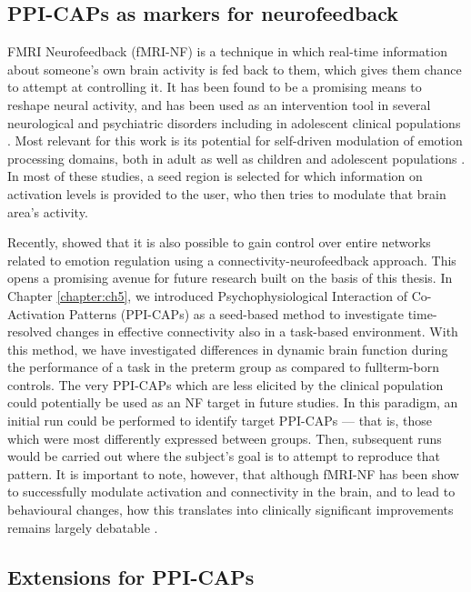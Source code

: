 \subsection*{PPI-CAPs as markers for neurofeedback} 
FMRI Neurofeedback (fMRI-NF) is a technique in which real-time information about someone's own brain activity is fed back to them, which gives them chance to attempt at controlling it. It has been found to be a promising means to reshape neural activity, and has been used as an intervention tool in several neurological and psychiatric disorders \citep{Guntensperger2017, Misaki2019} including in adolescent clinical populations \citep{Alegria2017}. Most relevant for this work is its potential for self-driven modulation of emotion processing domains, both in adult \citep{Koush2017,Lorenzetti2018} as well as children and adolescent populations \citep{CohenKadosh2016}. In most of these studies, a seed region is selected for which information on activation levels is provided to the user, who then tries to modulate that brain area's activity. 

Recently, \citet{Koush2017} showed that it is also possible to gain control over entire networks related to emotion regulation using a connectivity-neurofeedback approach. This opens a promising avenue for future research built on the basis of this thesis. In Chapter \ref{chapter:ch5}, we introduced Psychophysiological Interaction of Co-Activation Patterns (PPI-CAPs) as a seed-based method to investigate time-resolved changes in effective connectivity also in a task-based environment. With this method, we have investigated differences in dynamic brain function during the performance of a task in the preterm group as compared to fullterm-born controls. The very PPI-CAPs which are less elicited by the clinical population could potentially be used as an NF target in future studies. In this paradigm, an initial run could be performed to identify target PPI-CAPs --- that is, those which were most differently expressed between groups. Then, subsequent runs would be carried out where the subject's goal is to attempt to reproduce that pattern. It is important to note, however, that although fMRI-NF has been show to successfully modulate activation and connectivity in the brain, and to lead to behavioural changes, how this translates into clinically significant improvements remains largely debatable \citep{Thibault2018}.

\subsection*{ Extensions for PPI-CAPs}


